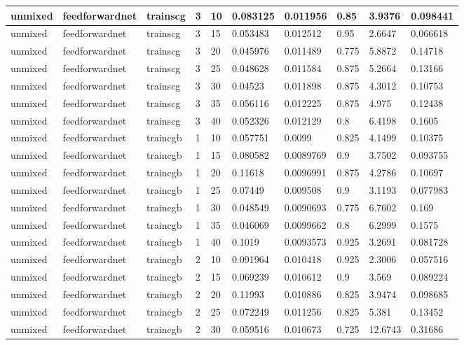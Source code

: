 \begin{longtable}{lllllllll}
unmixed & feedforwardnet & trainscg & 3 & 10 & 0.083125 & 0.011956 & 0.85 & 3.9376 & 0.098441 \\ \hline 
unmixed & feedforwardnet & trainscg & 3 & 15 & 0.053483 & 0.012512 & 0.95 & 2.6647 & 0.066618 \\ \hline 
unmixed & feedforwardnet & trainscg & 3 & 20 & 0.045976 & 0.011489 & 0.775 & 5.8872 & 0.14718 \\ \hline 
unmixed & feedforwardnet & trainscg & 3 & 25 & 0.048628 & 0.011584 & 0.875 & 5.2664 & 0.13166 \\ \hline 
unmixed & feedforwardnet & trainscg & 3 & 30 & 0.04523 & 0.011898 & 0.875 & 4.3012 & 0.10753 \\ \hline 
unmixed & feedforwardnet & trainscg & 3 & 35 & 0.056116 & 0.012225 & 0.875 & 4.975 & 0.12438 \\ \hline 
unmixed & feedforwardnet & trainscg & 3 & 40 & 0.052326 & 0.012129 & 0.8 & 6.4198 & 0.1605 \\ \hline 
unmixed & feedforwardnet & traincgb & 1 & 10 & 0.057751 & 0.0099 & 0.825 & 4.1499 & 0.10375 \\ \hline 
unmixed & feedforwardnet & traincgb & 1 & 15 & 0.080582 & 0.0089769 & 0.9 & 3.7502 & 0.093755 \\ \hline 
unmixed & feedforwardnet & traincgb & 1 & 20 & 0.11618 & 0.0096991 & 0.875 & 4.2786 & 0.10697 \\ \hline 
unmixed & feedforwardnet & traincgb & 1 & 25 & 0.07449 & 0.009508 & 0.9 & 3.1193 & 0.077983 \\ \hline 
unmixed & feedforwardnet & traincgb & 1 & 30 & 0.048549 & 0.0090693 & 0.775 & 6.7602 & 0.169 \\ \hline 
unmixed & feedforwardnet & traincgb & 1 & 35 & 0.046069 & 0.0099662 & 0.8 & 6.2999 & 0.1575 \\ \hline 
unmixed & feedforwardnet & traincgb & 1 & 40 & 0.1019 & 0.0093573 & 0.925 & 3.2691 & 0.081728 \\ \hline 
unmixed & feedforwardnet & traincgb & 2 & 10 & 0.091964 & 0.010418 & 0.925 & 2.3006 & 0.057516 \\ \hline 
unmixed & feedforwardnet & traincgb & 2 & 15 & 0.069239 & 0.010612 & 0.9 & 3.569 & 0.089224 \\ \hline 
unmixed & feedforwardnet & traincgb & 2 & 20 & 0.11993 & 0.010886 & 0.825 & 3.9474 & 0.098685 \\ \hline 
unmixed & feedforwardnet & traincgb & 2 & 25 & 0.072249 & 0.011256 & 0.825 & 5.381 & 0.13452 \\ \hline 
unmixed & feedforwardnet & traincgb & 2 & 30 & 0.059516 & 0.010673 & 0.725 & 12.6743 & 0.31686 \\ \hline 

\end{longtable}
